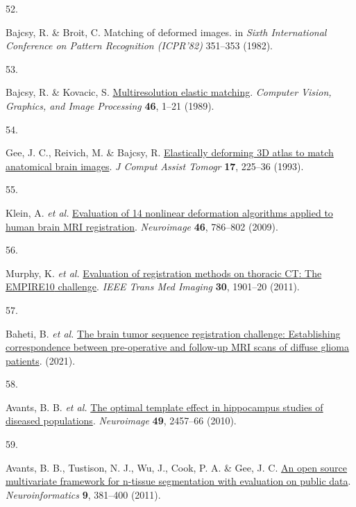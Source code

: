 \documentclass[
  12pt,
]{article}
\newlength{\cslhangindent}
\newlength{\csllabelwidth}
\newenvironment{CSLReferences}[2] %
 {\begin{list}{}{%
  \setlength{\itemindent}{0pt}
  \setlength{\leftmargin}{0pt}
  \setlength{\parsep}{0pt}
  \ifodd #1
   \setlength{\leftmargin}{\cslhangindent}
   \setlength{\itemindent}{-1\cslhangindent}
  \fi
  \setlength{\itemsep}{#2\baselineskip}}}
 {\end{list}}
\newcommand{\CSLLeftMargin}[1]{\parbox[t]{\csllabelwidth}{\strut#1\strut}}
\newcommand{\CSLRightInline}[1]{\parbox[t]{\linewidth - \csllabelwidth}{\strut#1\strut}}
\begin{document}
\begin{CSLReferences}{0}{0}
\CSLLeftMargin{52. }%
\CSLRightInline{Bajcsy, R. \& Broit, C. Matching of deformed images. in
\emph{{S}ixth {I}nternational {C}onference on {P}attern {R}ecognition
({ICPR}'82)} 351--353 (1982).}

\CSLLeftMargin{53. }%
\CSLRightInline{Bajcsy, R. \& Kovacic, S.
\href{https://doi.org/10.1016/S0734-189X(89)80014-3}{Multiresolution
elastic matching}. \emph{Computer Vision, Graphics, and Image
Processing} \textbf{46}, 1--21 (1989).}

\CSLLeftMargin{54. }%
\CSLRightInline{Gee, J. C., Reivich, M. \& Bajcsy, R.
\href{https://www.ncbi.nlm.nih.gov/pubmed/8454749}{Elastically deforming
3D atlas to match anatomical brain images}. \emph{J Comput Assist
Tomogr} \textbf{17}, 225--36 (1993).}

\CSLLeftMargin{55. }%
\CSLRightInline{Klein, A. \emph{et al.}
\href{https://doi.org/10.1016/j.neuroimage.2008.12.037}{Evaluation of 14
nonlinear deformation algorithms applied to human brain {MRI}
registration}. \emph{Neuroimage} \textbf{46}, 786--802 (2009).}

\CSLLeftMargin{56. }%
\CSLRightInline{Murphy, K. \emph{et al.}
\href{https://doi.org/10.1109/TMI.2011.2158349}{Evaluation of
registration methods on thoracic {CT}: The {EMPIRE10} challenge}.
\emph{IEEE Trans Med Imaging} \textbf{30}, 1901--20 (2011).}

\CSLLeftMargin{57. }%
\CSLRightInline{Baheti, B. \emph{et al.}
\href{https://arxiv.org/abs/2112.06979}{The brain tumor sequence
registration challenge: Establishing correspondence between
pre-operative and follow-up MRI scans of diffuse glioma patients}.
(2021).}

\CSLLeftMargin{58. }%
\CSLRightInline{Avants, B. B. \emph{et al.}
\href{https://doi.org/10.1016/j.neuroimage.2009.09.062}{The optimal
template effect in hippocampus studies of diseased populations}.
\emph{Neuroimage} \textbf{49}, 2457--66 (2010).}

\CSLLeftMargin{59. }%
\CSLRightInline{Avants, B. B., Tustison, N. J., Wu, J., Cook, P. A. \&
Gee, J. C. \href{https://doi.org/10.1007/s12021-011-9109-y}{An open
source multivariate framework for n-tissue segmentation with evaluation
on public data}. \emph{Neuroinformatics} \textbf{9}, 381--400 (2011).}


\end{CSLReferences}
\end{document}
